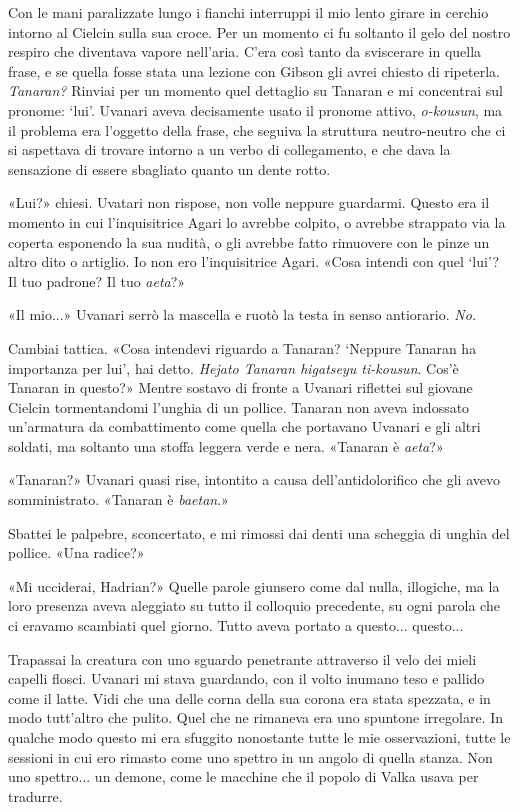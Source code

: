 Con le mani paralizzate lungo i fianchi interruppi il mio lento girare
in cerchio intorno al Cielcin sulla sua croce. Per un momento ci fu
soltanto il gelo del nostro respiro che diventava vapore nell'aria.
C'era così tanto da sviscerare in quella frase, e se quella fosse stata
una lezione con Gibson gli avrei chiesto di ripeterla. \emph{Tanaran?}
Rinviai per un momento quel dettaglio su Tanaran e mi concentrai sul
pronome: `lui'. Uvanari aveva decisamente usato il pronome attivo,
\emph{o-kousun}, ma il problema era l'oggetto della frase, che seguiva
la struttura neutro-neutro che ci si aspettava di trovare intorno a un
verbo di collegamento, e che dava la sensazione di essere sbagliato
quanto un dente rotto.

«Lui?» chiesi. Uvatari non rispose, non volle neppure guardarmi. Questo
era il momento in cui l'inquisitrice Agari lo avrebbe colpito, o avrebbe
strappato via la coperta esponendo la sua nudità, o gli avrebbe fatto
rimuovere con le pinze un altro dito o artiglio. Io non ero
l'inquisitrice Agari. «Cosa intendi con quel `lui'? Il tuo padrone? Il
tuo \emph{aeta}?»

«Il mio...» Uvanari serrò la mascella e ruotò la testa in senso
antiorario. \emph{No.}

Cambiai tattica. «Cosa intendevi riguardo a Tanaran? `Neppure Tanaran ha
importanza per lui', hai detto. \emph{Hejato Tanaran higatseyu
	ti-kousun}. Cos'è Tanaran in questo?» Mentre sostavo di fronte a Uvanari
riflettei sul giovane Cielcin tormentandomi l'unghia di un pollice.
Tanaran non aveva indossato un'armatura da combattimento come quella che
portavano Uvanari e gli altri soldati, ma soltanto una stoffa leggera
verde e nera. «Tanaran è \emph{aeta}?»

«Tanaran?» Uvanari quasi rise, intontito a causa dell'antidolorifico che
gli avevo somministrato. «Tanaran è \emph{baetan}.»

Sbattei le palpebre, sconcertato, e mi rimossi dai denti una scheggia di
unghia del pollice. «Una radice?»

«Mi ucciderai, Hadrian?» Quelle parole giunsero come dal nulla,
illogiche, ma la loro presenza aveva aleggiato su tutto il colloquio
precedente, su ogni parola che ci eravamo scambiati quel giorno. Tutto
aveva portato a questo... questo...

Trapassai la creatura con uno sguardo penetrante attraverso il velo dei
mieli capelli flosci. Uvanari mi stava guardando, con il volto inumano
teso e pallido come il latte. Vidi che una delle corna della sua corona
era stata spezzata, e in modo tutt'altro che pulito. Quel che ne
rimaneva era uno spuntone irregolare. In qualche modo questo mi era
sfuggito nonostante tutte le mie osservazioni, tutte le sessioni in cui
ero rimasto come uno spettro in un angolo di quella stanza. Non uno
spettro... un demone, come le macchine che il popolo di Valka usava per
tradurre.

